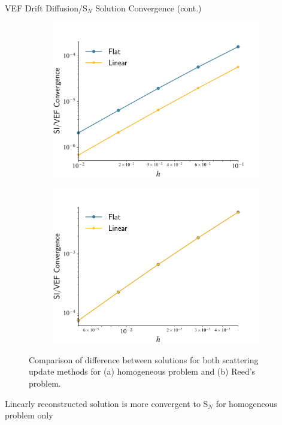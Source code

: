 \documentclass[10pt]{beamer}
\newcommand{\SN}{S$_N$\xspace}
\begin{document}
\begin{frame}{VEF Drift Diffusion/\SN Solution Convergence (cont.)}

	\begin{figure}[htb]
		\centering
		\begin{subfigure}{.5\textwidth}
			\centering
			\includegraphics[width=\textwidth]{figs/solconv_homo.pdf}
			\caption{}
			\label{fig:homo}
		\end{subfigure}
		\hspace{-2em}
		\begin{subfigure}{.5\textwidth}
			\centering
			\includegraphics[width=\textwidth]{figs/solconv_reed.pdf}
			\caption{}
			\label{fig:reed}
		\end{subfigure}
		\caption{Comparison of difference between solutions for both scattering update methods for (a) homogeneous problem and (b) Reed's problem. }
	\end{figure}

	\pause
	\begin{block}{}
		\centering Linearly reconstructed solution is more convergent to \SN for homogeneous problem only 
	\end{block}

\end{frame}
\end{document}
